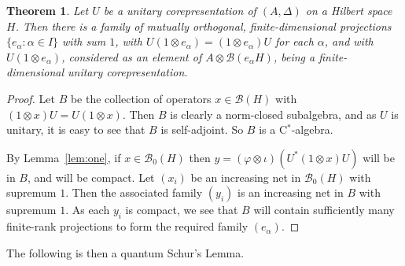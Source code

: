 \documentclass[twoside,a4paper,12pt]{article}
\theoremstyle{plain}
\newtheorem{theorem}[proposition]{Theorem}
\theoremstyle{definition}
\newcommand{\mc}{\mathcal}
\begin{document}
\begin{theorem}\label{thm:corepdec}
Let $U$ be a unitary corepresentation of $(A,\Delta)$ on a Hilbert space
$H$.  Then there is a family of mutually orthogonal, finite-dimensional
projections $\{ e_\alpha : \alpha\in I \}$ with sum $1$, with
$U(1\otimes e_\alpha) = (1\otimes e_\alpha) U$ for each $\alpha$,
and with $U(1\otimes e_\alpha)$, considered as an element of
$A\otimes \mc B(e_\alpha H)$, being a finite-dimensional unitary
corepresentation.
\end{theorem}
\begin{proof}
Let $B$ be the collection of operators $x\in\mc B(H)$ with $(1\otimes x)U
= U(1\otimes x)$.  Then $B$ is clearly a norm-closed subalgebra, and as
$U$ is unitary, it is easy to see that $B$ is self-adjoint.  So $B$ is a
C$^*$-algebra.  

By Lemma~\ref{lem:one}, if $x\in\mc B_0(H)$ then 
$y=(\varphi\otimes\iota)(U^*(1\otimes x)U)$ will be in $B$, and will be
compact.  Let $(x_i)$ be an increasing net in $\mc B_0(H)$ with supremum $1$.
Then the associated family $(y_i)$ is an increasing net in $B$ with supremum
$1$.  As each $y_i$ is compact, we see that $B$ will contain sufficiently
many finite-rank projections to form the required family $(e_\alpha)$.
\end{proof}

The following is then a quantum Schur's Lemma.
\end{document}
